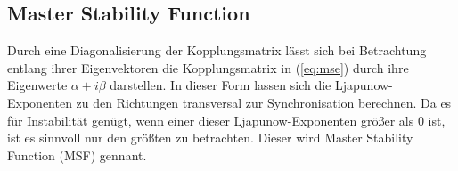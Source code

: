 \subsection*{Master Stability Function}
Durch eine Diagonalisierung der Kopplungsmatrix lässt sich bei Betrachtung entlang ihrer Eigenvektoren die Kopplungsmatrix in (\ref{eq:mse}) durch ihre Eigenwerte $\alpha+i\beta$ darstellen. In dieser Form lassen sich die Ljapunow-Exponenten zu den Richtungen transversal zur Synchronisation berechnen. Da es für Instabilität genügt, wenn einer dieser Ljapunow-Exponenten größer als 0 ist, ist es sinnvoll nur den größten zu betrachten. Dieser wird Master Stability Function (MSF) gennant. 



